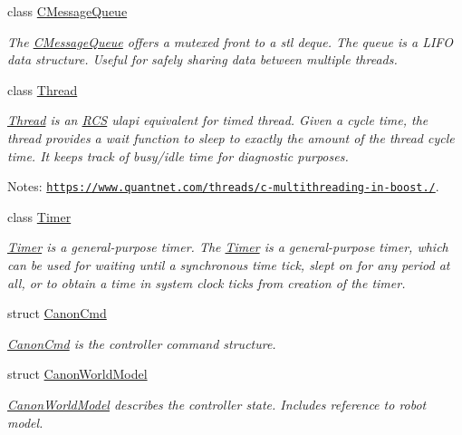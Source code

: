 \begin{DoxyCompactItemize}
class \hyperlink{classRCS_1_1CMessageQueue}{C\-Message\-Queue}
\begin{DoxyCompactList}\small\item\em The \hyperlink{classRCS_1_1CMessageQueue}{C\-Message\-Queue} offers a mutexed front to a stl deque. The queue is a L\-I\-F\-O data structure. Useful for safely sharing data between multiple threads. \end{DoxyCompactList}\item 
class \hyperlink{classRCS_1_1Thread}{Thread}
\begin{DoxyCompactList}\small\item\em \hyperlink{classRCS_1_1Thread}{Thread} is an \hyperlink{namespaceRCS}{R\-C\-S} ulapi equivalent for timed thread. Given a cycle time, the thread provides a wait function to sleep to exactly the amount of the thread cycle time. It keeps track of busy/idle time for diagnostic purposes. \par
 Notes\-: \href{https://www.quantnet.com/threads/c-multithreading-in-boost.10028/}{\tt https\-://www.\-quantnet.\-com/threads/c-\/multithreading-\/in-\/boost./}. \end{DoxyCompactList}\item 
class \hyperlink{classRCS_1_1Timer}{Timer}
\begin{DoxyCompactList}\small\item\em \hyperlink{classRCS_1_1Timer}{Timer} is a general-\/purpose timer. The \hyperlink{classRCS_1_1Timer}{Timer} is a general-\/purpose timer, which can be used for waiting until a synchronous time tick, slept on for any period at all, or to obtain a time in system clock ticks from creation of the timer. \end{DoxyCompactList}\item 
struct \hyperlink{structRCS_1_1CanonCmd}{Canon\-Cmd}
\begin{DoxyCompactList}\small\item\em \hyperlink{structRCS_1_1CanonCmd}{Canon\-Cmd} is the controller command structure. \end{DoxyCompactList}\item 
struct \hyperlink{structRCS_1_1CanonWorldModel}{Canon\-World\-Model}
\begin{DoxyCompactList}\small\item\em \hyperlink{structRCS_1_1CanonWorldModel}{Canon\-World\-Model} describes the controller state. Includes reference to robot model. \end{DoxyCompactList}\end{DoxyCompactItemize}
